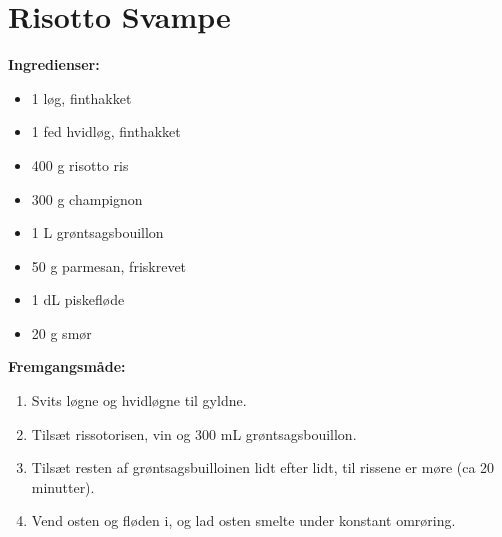 \documentclass{book}
\begin{document}
\section{Risotto Svampe}
\begin{minipage}[t]{0.5\textwidth}
\textbf{Ingredienser:}
\begin{itemize}
    \item 1 løg, finthakket
    \item 1 fed hvidløg, finthakket
    \item 400 g risotto ris
    \item 300 g champignon
    \item 1 L grøntsagsbouillon
    \item 50 g parmesan, friskrevet
    \item 1 dL piskefløde
    \item 20 g smør
\end{itemize}
\end{minipage}
\begin{minipage}[t]{0.5\textwidth}
\textbf{Fremgangsmåde:}
\begin{enumerate}
    \item Svits løgne og hvidløgne til gyldne.
    \item Tilsæt rissotorisen, vin og 300 mL grøntsagsbouillon.
    \item Tilsæt resten af grøntsagsbuilloinen lidt efter lidt, til rissene er møre (ca 20 minutter).
    \item Vend osten og fløden i, og lad osten smelte under konstant omrøring.
\end{enumerate}
\end{minipage}
\end{document}
